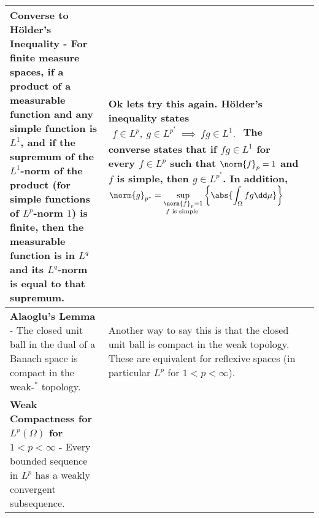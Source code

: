 \begin{longtable}{|*{3}{>{\centering\arraybackslash}p{}|}}
            \textbf{Converse to H\"{o}lder's Inequality} - For finite measure spaces, if a product of a measurable function and any simple function is $L^1$, and if the supremum of the $L^1$-norm of the product (for simple functions of $L^p$-norm $1$) is finite, then the measurable function is in $L^q$ and its $L^q$-norm is equal to that supremum. \newline {$\!\begin{gathered}M(g) = \sup_{\substack{\norm{f}_p = 1 \\ f \text{ is simple }}} \left\{\abs{\int_\Omega fg \dd\mu}\right\} < \infty \\ \implies \\ g \in L^q(\Omega)\ \ \text{and}\ \ \norm{g}_q = M(g) \end{gathered}$}
            &
            Ok lets try this again.  H\"{o}lder's inequality states \newline
            {$\!\begin{gathered}
                f \in L^p,\ g \in L^{p^*}\ \implies\ fg \in L^1.
            \end{gathered}$}
            \newline\newline The converse states that if $fg \in L^1$ for every $f \in L^p$ such that $\norm{f}_p = 1$ and $f$ is simple, then $g \in L^{p^*}$.  In addition, \newline
            {$\!\begin{gathered}
                \norm{g}_{p^*} = \sup_{\substack{\norm{f}_p = 1 \\ f \text{ is simple }}} \left\{\abs{\int_\Omega fg \dd\mu}\right\}
            \end{gathered}$}
            \\[6pt] \hline
            
            \textbf{Alaoglu's Lemma} - The closed unit ball in the dual of a Banach space is compact in the weak-$^*$ topology.
            &
            Another way to say this is that the closed unit ball is compact in the weak topology.  These are equivalent for reflexive spaces (in particular $L^p$ for $1 < p < \infty$).
            \\[6pt] \hline
            
            \textbf{Weak Compactness for $L^p(\Omega)$ for $1 < p < \infty$} - Every bounded sequence in $L^p$ has a weakly convergent subsequence.
            &
            
            \\[6pt] \hline
            

\end{longtable}
